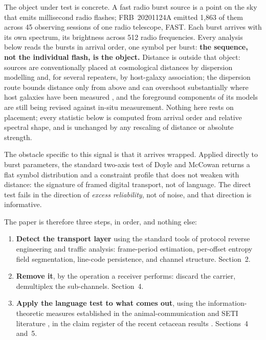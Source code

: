 \documentclass[11pt,a4paper]{article}
\begin{document}
The object under test is concrete. A fast radio burst source is a point on the sky
that emits millisecond radio flashes; FRB~20201124A emitted 1{,}863 of them across 45
observing sessions of one radio telescope, FAST. Each burst arrives with its own
spectrum, its brightness across 512 radio frequencies. Every analysis below reads the
bursts in arrival order, one symbol per burst: \textbf{the sequence, not the
individual flash, is the object.} Distance is outside that object: sources
are conventionally placed at cosmological distances by dispersion modelling
and, for several repeaters, by host-galaxy association; the dispersion route
bounds distance only from above and can overshoot
substantially where host galaxies have been measured
\cite{kumarlinder2019,ocker2022}, and the foreground
components of its models are still being revised against in-situ
measurement. Nothing here rests on placement; every statistic below is
computed from arrival order and relative spectral shape, and is unchanged by
any rescaling of distance or absolute strength.

The obstacle specific to this signal is that it arrives wrapped. Applied directly to
burst parameters, the standard two-axis test of Doyle and McCowan
\cite{mccowan1999,doyle2011} returns a flat symbol distribution and a constraint profile
that does not weaken with distance: the signature of framed digital transport, not of
language. The direct test fails in the direction of \emph{excess reliability}, not of
noise, and that direction is informative.

The paper is therefore three steps, in order, and nothing else:

\begin{enumerate}[leftmargin=1.6em,itemsep=2pt]
\item \textbf{Detect the transport layer} using the standard tools of protocol reverse
engineering and traffic analysis: frame-period estimation, per-offset entropy field
segmentation, line-code persistence, and channel structure. Section~2.
\item \textbf{Remove it}, by the operation a receiver performs: discard the carrier,
demultiplex the sub-channels. Section~4.
\item \textbf{Apply the language test to what comes out}, using the
information-theoretic measures established in the animal-communication and SETI
literature \cite{mccowan1999,doyle2011}, in the claim register of the recent cetacean
results \cite{arnon2025,sharma2024}. Sections~4 and~5.
\end{enumerate}
\end{document}
